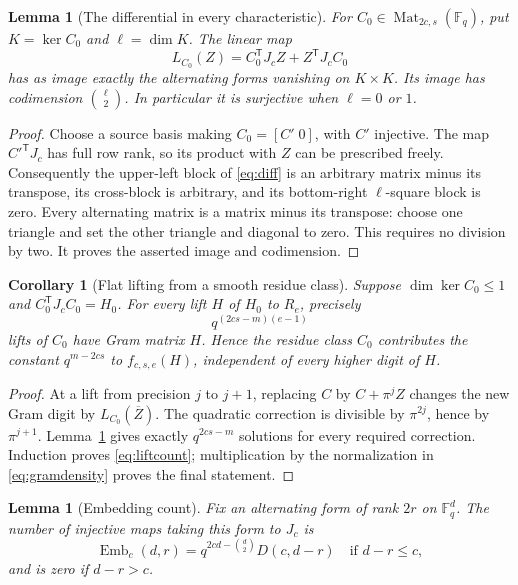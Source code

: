 \documentclass[11pt]{article}
\newtheorem{lemma}[theorem]{Lemma}
\newtheorem{corollary}[theorem]{Corollary}
\theoremstyle{remark}
\newcommand{\FF}{\mathbb F}
\newcommand{\Mat}{\operatorname{Mat}}
\newcommand{\Emb}{\operatorname{Emb}}
\newcommand{\trans}{\mathsf T}
\begin{document}
\begin{lemma}[The differential in every characteristic]\label{lem:diff}
For \(C_0\in\Mat_{2c,s}(\FF_q)\), put \(K=\ker C_0\) and
\(\ell=\dim K\). The linear map
\[
 L_{C_0}(Z)=C_0^\trans J_cZ+Z^\trans J_cC_0
 \tag{3.2}\label{eq:diff}
\]
has as image exactly the alternating forms vanishing on \(K\times K\).
Its image has codimension \(\binom{\ell}{2}\).
In particular it is surjective when \(\ell=0\) or \(1\).
\end{lemma}

\begin{proof}
Choose a source basis making \(C_0=[C'\;0]\), with \(C'\) injective.
The map \(C'^\trans J_c\) has full row rank, so its product with \(Z\)
can be prescribed freely. Consequently the upper-left block of
\eqref{eq:diff} is an arbitrary matrix minus its transpose, its cross-block
is arbitrary, and its bottom-right \(\ell\)-square block is zero.
Every alternating matrix is a matrix minus its transpose: choose one
triangle and set the other triangle and diagonal to zero.
This requires no division by two. It proves the asserted image and
codimension.
\end{proof}

\begin{corollary}[Flat lifting from a smooth residue class]\label{cor:lifts}
Suppose \(\dim\ker C_0\le1\) and \(C_0^\trans J_cC_0=H_0\).
For every lift \(H\) of \(H_0\) to \(R_e\), precisely
\[
 q^{(2cs-m)(e-1)}
 \tag{3.3}\label{eq:liftcount}
\]
lifts of \(C_0\) have Gram matrix \(H\).
Hence the residue class \(C_0\) contributes the constant \(q^{m-2cs}\)
to \(f_{c,s,e}(H)\), independent of every higher digit of \(H\).
\end{corollary}

\begin{proof}
At a lift from precision \(j\) to \(j+1\), replacing \(C\) by
\(C+\pi^jZ\) changes the new Gram digit by \(L_{C_0}(\overline Z)\).
The quadratic correction is divisible by \(\pi^{2j}\), hence by
\(\pi^{j+1}\). Lemma~\ref{lem:diff} gives exactly \(q^{2cs-m}\)
solutions for every required correction. Induction proves
\eqref{eq:liftcount}; multiplication by the normalization in
\eqref{eq:gramdensity} proves the final statement.
\end{proof}

\begin{lemma}[Embedding count]\label{lem:emb}
Fix an alternating form of rank \(2r\) on \(\FF_q^d\).
The number of injective maps taking this form to \(J_c\) is
\[
 \Emb_c(d,r)=q^{2cd-\binom d2}D(c,d-r)
 \quad\text{if }d-r\le c,
 \tag{3.4}\label{eq:emb}
\]
and is zero if \(d-r>c\).
\end{lemma}
\end{document}
